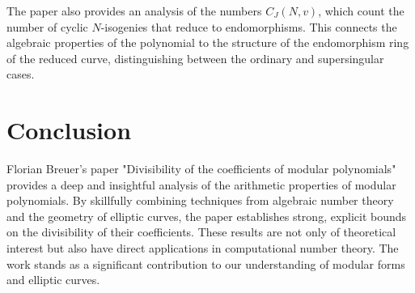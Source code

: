 \documentclass[12pt, a4paper]{article}
\theoremstyle{plain}
\theoremstyle{definition}
\begin{document}
The paper also provides an analysis of the numbers $C_J(N,v)$, which count the number of cyclic $N$-isogenies that reduce to endomorphisms. This connects the algebraic properties of the polynomial to the structure of the endomorphism ring of the reduced curve, distinguishing between the ordinary and supersingular cases.

\section{Conclusion}

Florian Breuer's paper "Divisibility of the coefficients of modular polynomials" provides a deep and insightful analysis of the arithmetic properties of modular polynomials. By skillfully combining techniques from algebraic number theory and the geometry of elliptic curves, the paper establishes strong, explicit bounds on the divisibility of their coefficients. These results are not only of theoretical interest but also have direct applications in computational number theory. The work stands as a significant contribution to our understanding of modular forms and elliptic curves.



\end{document}
